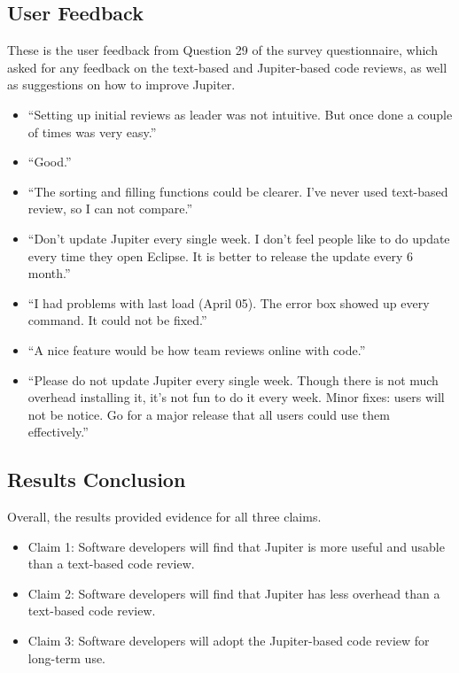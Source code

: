 \subsection{User Feedback}
\label{subsec:user-feedback}

These is the user feedback from Question 29 of the survey questionnaire, which asked for any feedback on the text-based and Jupiter-based code reviews, as well as suggestions on how to improve Jupiter.

\begin{itemize}
	\item ``Setting up initial reviews as leader was not intuitive. But once done a couple of times was very easy.''
	\item ``Good.''
	\item ``The sorting and filling functions could be clearer. I've never used text-based review, so I can not compare.''
	\item ``Don't update Jupiter every single week. I don't feel people like to do update every time they open Eclipse. It is better to release the update every 6 month.''
	\item ``I had problems with last load (April 05). The error box showed up every command. It could not be fixed.''
	\item ``A nice feature would be how team reviews online with code.''
	\item ``Please do not update Jupiter every single week. Though there is not much overhead installing it, it's not fun to do it every week. Minor fixes: users will not be notice. Go for a major release that all users could use them effectively.''
\end{itemize}

\subsection{Results Conclusion}
\label{subsec:results-conclusion}

Overall, the results provided evidence for all three claims.

\begin{itemize}
	\item Claim 1: Software developers will find that Jupiter is more useful and usable than a text-based code review.
	\item Claim 2: Software developers will find that Jupiter has less overhead than a text-based code review.
	\item Claim 3: Software developers will adopt the Jupiter-based code review for long-term use.
\end{itemize}

